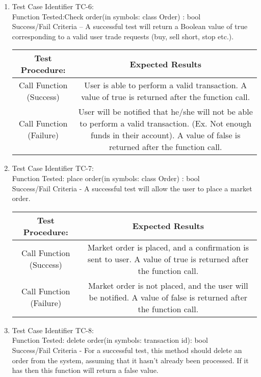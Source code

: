   \begin{enumerate}
  \item
  Test Case Identifier TC-6:\\
    Function Tested:Check order(in symbols: class Order) : bool\\
    Success/Fail Criteria – A successful test will return a Boolean value of
    true corresponding to a valid user trade requests (buy, sell short, stop
    etc.).\\
    \begin{tabular}{| c | c |}
    \hline
    \textbf{Test Procedure:} & \textbf{Expected Results} \\ \hline
    Call Function (Success) & User is able to perform a valid transaction.
    A value of true is returned after the function call. \\ \hline
    Call Function (Failure) & User will be notified that he/she will not be
    able to perform a valid transaction. (Ex. Not enough funds in their account).
    A value of false is returned after the function call. \\ \hline
    \end{tabular}
  \item
  Test Case Identifier TC-7:\\
    Function Tested: place order(in symbols: class Order) : bool\\
    Success/Fail Criteria - A successful test will allow the user to place a
    market order.\\
    \begin{tabular}{| c | c |}
    \hline
    \textbf{Test Procedure:} & \textbf{Expected Results} \\ \hline
    Call Function (Success) & Market order is placed, and a confirmation is sent
    to user. A value of true is returned after the function call. \\ \hline
    Call Function (Failure) & Market order is not placed, and the user will be
    notified. A value of false is returned after the function call.\\ \hline
    \end{tabular}
  \item
  Test Case Identifier TC-8:\\
    Function Tested: delete order(in symbols: transaction id): bool\\
    Success/Fail Criteria - For a successful test, this method should delete an
    order from the system, assuming that it hasn’t already been processed. If it
    has then this function will return a false value.\\

\end{enumerate}
